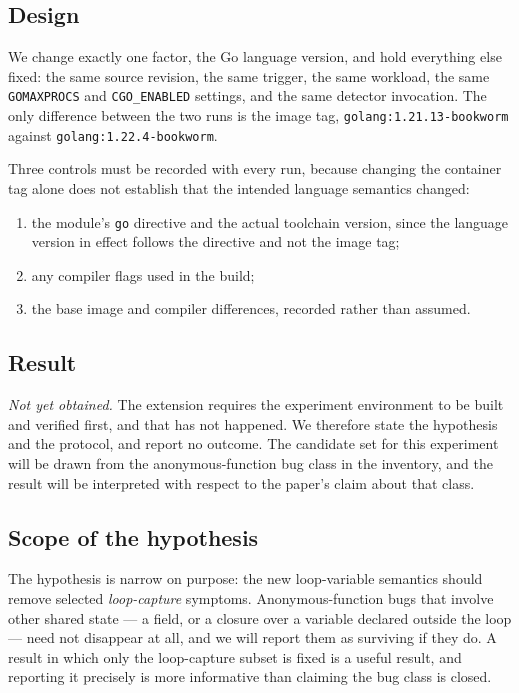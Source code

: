 \documentclass[11pt]{article}
\begin{document}
\subsection{Design}

We change exactly one factor, the Go language version, and hold everything
else fixed: the same source revision, the same trigger, the same workload,
the same \texttt{GOMAXPROCS} and \texttt{CGO\_ENABLED} settings, and the same
detector invocation. The only difference between the two runs is the image
tag, \texttt{golang:1.21.13-bookworm} against \texttt{golang:1.22.4-bookworm}.

Three controls must be recorded with every run, because changing the
container tag alone does not establish that the intended language semantics
changed:

\begin{enumerate}
\item the module's \texttt{go} directive and the actual toolchain version,
  since the language version in effect follows the directive and not the
  image tag;
\item any compiler flags used in the build;
\item the base image and compiler differences, recorded rather than assumed.
\end{enumerate}

\subsection{Result}

\emph{Not yet obtained.} The extension requires the experiment environment to
be built and verified first, and that has not happened. We therefore state
the hypothesis and the protocol, and report no outcome. The candidate set for
this experiment will be drawn from the anonymous-function bug class in the
inventory, and the result will be interpreted with respect to the paper's
claim about that class.

\subsection{Scope of the hypothesis}

The hypothesis is narrow on purpose: the new loop-variable semantics should
remove selected \emph{loop-capture} symptoms. Anonymous-function bugs that
involve other shared state --- a field, or a closure over a variable
declared outside the loop --- need not disappear at all, and we will report
them as surviving if they do. A result in which only the loop-capture subset
is fixed is a useful result, and reporting it precisely is more informative
than claiming the bug class is closed.
\end{document}
